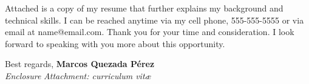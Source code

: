 \documentclass[a4paper,nonstopmode,11pt]{article}
\begin{document}
Attached is a copy of my resume that further explains my background and technical skills. I can be reached anytime via my cell phone, 555-555-5555 or via email at name@email.com. Thank you for your time and consideration. I look forward to speaking with you more about this opportunity.

Best regards,
%
{\bfseries Marcos Quezada Pérez}\\
%
\vfill%
{\slshape Enclosure}
{\slshape Attachment: curriculum vit\ae{}}
\end{document}
